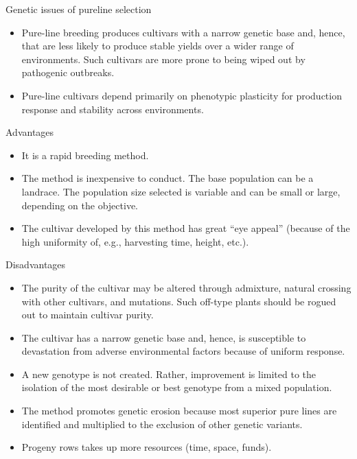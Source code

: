 \documentclass[11pt,ignorenonframetext,aspectratio=169]{beamer}
\providecommand{\tightlist}{%
  \setlength{\itemsep}{0pt}\setlength{\parskip}{0pt}}
\begin{document}
\begin{frame}{Genetic issues of pureline selection}
\protect\hypertarget{genetic-issues-of-pureline-selection}{}
\begin{itemize}
\tightlist
\item
  Pure-line breeding produces cultivars with a narrow genetic base and,
  hence, that are less likely to produce stable yields over a wider
  range of environments. Such cultivars are more prone to being wiped
  out by pathogenic outbreaks.
\item
  Pure-line cultivars depend primarily on phenotypic plasticity for
  production response and stability across environments.
\end{itemize}
\end{frame}

\begin{frame}{Advantages}
\protect\hypertarget{advantages-1}{}
\begin{itemize}
\tightlist
\item
  It is a rapid breeding method.
\item
  The method is inexpensive to conduct. The base population can be a
  landrace. The population size selected is variable and can be small or
  large, depending on the objective.
\item
  The cultivar developed by this method has great ``eye appeal''
  (because of the high uniformity of, e.g., harvesting time, height,
  etc.).
\end{itemize}
\end{frame}

\begin{frame}{Disadvantages}
\protect\hypertarget{disadvantages-1}{}
\begin{itemize}
\tightlist
\item
  The purity of the cultivar may be altered through admixture, natural
  crossing with other cultivars, and mutations. Such off-type plants
  should be rogued out to maintain cultivar purity.
\item
  The cultivar has a narrow genetic base and, hence, is susceptible to
  devastation from adverse environmental factors because of uniform
  response.
\item
  A new genotype is not created. Rather, improvement is limited to the
  isolation of the most desirable or best genotype from a mixed
  population.
\item
  The method promotes genetic erosion because most superior pure lines
  are identified and multiplied to the exclusion of other genetic
  variants.
\item
  Progeny rows takes up more resources (time, space, funds).
\end{itemize}
\end{frame}
\end{document}
